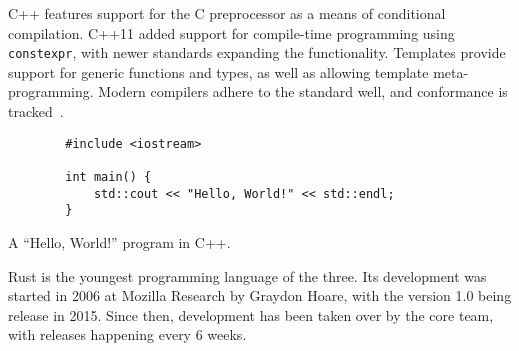 \documentclass[british]{scrreprt}
\begin{document}
C++ features support for the C preprocessor as a means of conditional compilation. C++11 added support for compile-time programming using \texttt{constexpr}, with newer standards expanding the functionality. Templates provide support for generic functions and types, as well as allowing template meta-programming. Modern compilers adhere to the standard well, and conformance is tracked~\cite{CppCompilerSupport}.

\begin{listing}
	\centering
	\begin{verbatim}
		#include <iostream>

		int main() {
			std::cout << "Hello, World!" << std::endl;
		}
	\end{verbatim}
	\caption{A \enquote{Hello, World!} program in C++.}
\end{listing}

Rust is the youngest programming language of the three. Its development was started in 2006 at Mozilla Research by Graydon Hoare, with the version 1.0 being release in 2015. Since then, development has been taken over by the core team, with releases happening every 6 weeks.
\end{document}

